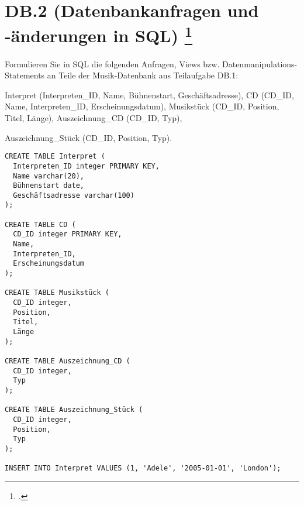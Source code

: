 \documentclass{lehramt-informatik-aufgabe}
\begin{document}
\section{DB.2 (Datenbankanfragen und -änderungen in SQL)
\footcite{66116:2015:03}}

Formulieren Sie in SQL die folgenden Anfragen, Views bzw.
Datenmanipulations-Statements an Teile der Musik-Datenbank aus
Teilaufgabe DB.1:

Interpret (Interpreten\_ID, Name, Bühnenstart, Geschäftsadresse),
CD (CD\_ID, Name, Interpreten\_ID, Erscheinungsdatum),
Musikstück (CD\_ID, Position, Titel, Länge),
Auszeichnung\_CD (CD\_ID, Typ),

Auszeichnung\_Stück (CD\_ID, Position, Typ).

\begin{verbatim}
CREATE TABLE Interpret (
  Interpreten_ID integer PRIMARY KEY,
  Name varchar(20),
  Bühnenstart date,
  Geschäftsadresse varchar(100)
);

CREATE TABLE CD (
  CD_ID integer PRIMARY KEY,
  Name,
  Interpreten_ID,
  Erscheinungsdatum
);

CREATE TABLE Musikstück (
  CD_ID integer,
  Position,
  Titel,
  Länge
);

CREATE TABLE Auszeichnung_CD (
  CD_ID integer,
  Typ
);

CREATE TABLE Auszeichnung_Stück (
  CD_ID integer,
  Position,
  Typ
);

INSERT INTO Interpret VALUES (1, 'Adele', '2005-01-01', 'London');
\end{verbatim}
\end{document}
